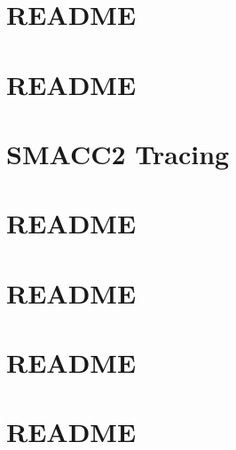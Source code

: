 \documentclass[twoside]{book}
\newcommand{\+}{\discretionary{\mbox{\scriptsize$\hookleftarrow$}}{}{}}
\begin{document}
\chapter{README}
\label{md_smacc2_performance_tools_performance_tests_sm_atomic_subscribers_performance_test_README}

\chapter{README}
\label{md_smacc2_performance_tools_performance_tests_sm_coretest_transition_speed_1_README}

\chapter{SMACC2 Tracing}
\label{md_smacc2_performance_tools_tracing_tools_README}

\chapter{README}
\label{md_smacc2_sm_reference_library__smacc2_sm_template_README}

\chapter{README}
\label{md_smacc2_sm_reference_library_sm_advanced_recovery_1_README}

\chapter{README}
\label{md_smacc2_sm_reference_library_sm_atomic_README}

\chapter{README}
\label{md_smacc2_sm_reference_library_sm_autoware_avp_README}

\end{document}
